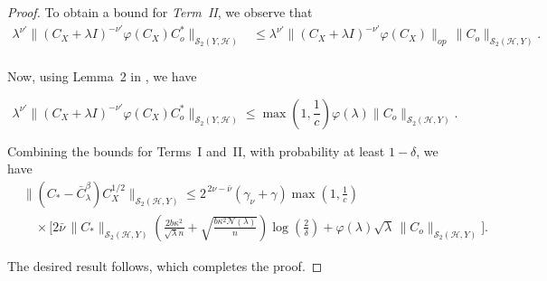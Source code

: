 \documentclass[twoside,11pt]{article}
\begin{document}
\begin{proof}
\noindent
To obtain a bound for \emph{Term~II}, we observe that
\begin{align*}
\lambda^{\nu'}
\bigl\|(C_X+\lambda I)^{-\nu'}\varphi(C_X)C_o^*\bigr\|_{\mathcal S_2(Y,\mathcal H)}
&\le
\lambda^{\nu'}
\bigl\|(C_X+\lambda I)^{-\nu'}\varphi(C_X)\bigr\|_{{op}}
\,\|C_o\|_{\mathcal S_2(\mathcal H,Y)}.
\nonumber\\
\end{align*}

\noindent
Now, using Lemma~2 in \cite{Gupta_2025}, we have

\[\lambda^{\nu'}
\bigl\|(C_X+\lambda I)^{-\nu'}\varphi(C_X)C_o^*\bigr\|_{\mathcal S_2(Y,\mathcal H)}\le
\max\!\left(1,\frac{1}{c}\right) 
\varphi(\lambda)\|C_o\|_{\mathcal S_2(\mathcal H,Y)}.\]

\noindent
Combining the bounds for Terms~I and~II, with probability at least $1-\delta$, we have
\begin{align*}
&\bigl\|(C_*-\bar{C}_{\lambda}^\beta) C_X^{1/2}
\bigr\|_{\mathcal S_2(\mathcal H,Y)}
\le
2^{\,2\nu-\bar \nu}
(\gamma_\nu+\gamma)\max\!\left(1,\frac{1}{c}\right) \\
&\quad\times
\Biggl[
2\bar \nu\,\|C_{*}\|_{\mathcal S_2(\mathcal H,Y)}
\left(
\frac{2b\kappa^2}{\sqrt \lambda n}
+
\sqrt{\frac{b\kappa^2\mathcal N(\lambda)}{n}}
\right)
\log\!\left(\frac{2}{\delta}\right) 
+
\varphi(\lambda)\sqrt{\lambda}\,
\|C_o\|_{\mathcal S_2(\mathcal H,Y)}
\Biggr].
\end{align*}


\noindent
The desired result follows, which completes the proof.
\end{proof}
\end{document}
